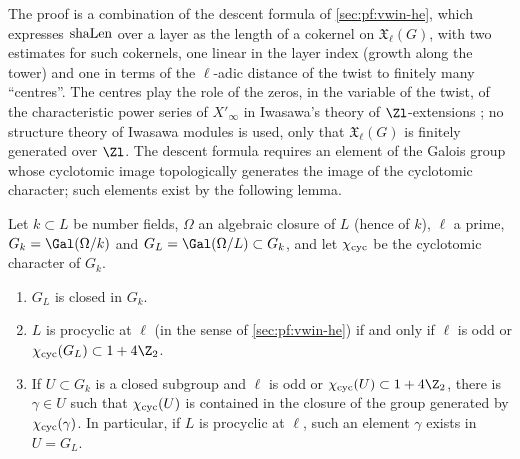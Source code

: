 The proof is a combination of the descent formula of \cref{sec:pf:vwin-he}, which expresses $\mathrm{shaLen}$ over a layer as the
length of a cokernel on $\mathfrak X_\ell(G)$, with two estimates for such cokernels, one linear in the layer index (growth
along the tower) and one in terms of the $\ell$-adic distance of the twist to finitely many ``centres''. The centres play the
role of the zeros, in the variable of the twist, of the characteristic power series of $X'_\infty$ in Iwasawa's theory of
$\Zl$-extensions \cite{Iwasawa1973}; no structure theory of Iwasawa modules is used, only that $\mathfrak X_\ell(G)$ is finitely
generated over $\Zl$. The descent formula requires an element of the Galois group whose cyclotomic image topologically generates the
image of the cyclotomic character; such elements exist by the following lemma.

\begin{lemma}\label{pf:vwin:gengal}
Let $k\subset L$ be number fields, $\Omega$ an algebraic closure of $L$ (hence of $k$), $\ell$ a prime, $G_k=\Gal(\Omega/k)$ and
$G_L=\Gal(\Omega/L)\subset G_k$, and let $\chi_{\mathrm{cyc}}$ be the cyclotomic character of $G_k$.
\begin{enumerate}[label=(\alph*)]
\item\label{pf:vwin:gengal-a} $G_L$ is closed in $G_k$.
\item\label{pf:vwin:gengal-b} $L$ is procyclic at $\ell$ (in the sense of \cref{sec:pf:vwin-he}) if and only if $\ell$ is odd or
$\vwincyc(G_L)\subset1+4\Z_2$.
\item\label{pf:vwin:gengal-c} If $U\subset G_k$ is a closed subgroup and $\ell$ is odd or $\vwincyc(U)\subset1+4\Z_2$, there is $\gamma\in U$
such that $\chi_{\mathrm{cyc}}(U)$ is contained in the closure of the group generated by $\chi_{\mathrm{cyc}}(\gamma)$. In particular, if $L$ is procyclic
at $\ell$, such an element $\gamma$ exists in $U=G_L$.
\end{enumerate}
\end{lemma}


